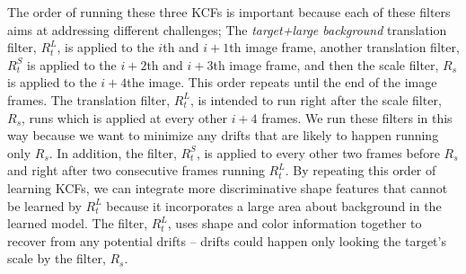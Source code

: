 \documentclass{bmvc2k}
\begin{document}
The order of running these three KCFs is important because each of
these filters aims at addressing different challenges; The
\textit{target+large background} translation filter, $R_{t}^{L}$, is
applied to the $i$th and $i+1$th image frame, another translation
filter, $R_{t}^{S}$ is applied to the $i+2$th and $i+3$th image frame,
and then the scale filter, $R_{s}$ is applied to the $i+4$the
image. This order repeats until the end of the image frames. The
translation filter, $R_{t}^{L}$, is intended to run right after the
scale filter, $R_s$, runs which is applied at every other $i+4$
frames. We run these filters in this way because we want to minimize
any drifts that are likely to happen running only $R_{s}$. In
addition, the filter, $R_{t}^{S}$, is applied to every other two
frames before $R_{s}$ and right after two consecutive frames running
$R_{t}^{L}$. By repeating this order of learning KCFs, we can
integrate more discriminative shape features that cannot be learned by
$R_{t}^{L}$ because it incorporates a large area about background in
the learned model. The filter, $R_{t}^{L}$, uses shape and color
information together to recover from any potential drifts -- drifts
could happen only looking the target's scale by the filter, $R_{s}$.
\end{document}
